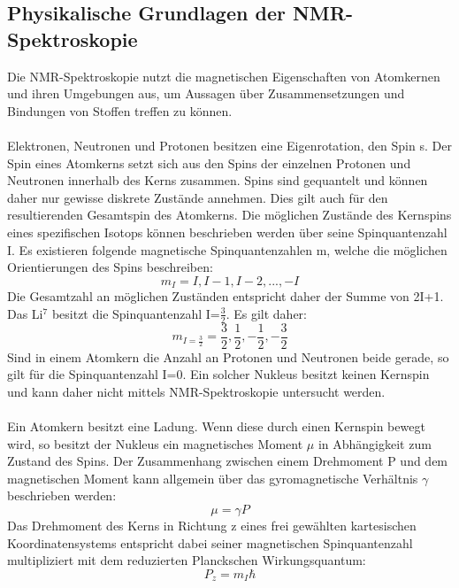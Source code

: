 \documentclass[a4paper, 11pt, headsepline,footsepline,twoside,abstract]{scrbook}
\begin{document}
\subsection{Physikalische Grundlagen der NMR-Spektroskopie}
Die NMR-Spektroskopie nutzt die magnetischen Eigenschaften von Atomkernen und ihren Umgebungen aus, um Aussagen über Zusammensetzungen und Bindungen von Stoffen treffen zu können.
\\\\
Elektronen, Neutronen und Protonen besitzen eine Eigenrotation, den Spin s. Der Spin eines Atomkerns setzt sich aus den Spins der einzelnen Protonen und Neutronen innerhalb des Kerns zusammen. Spins sind gequantelt und können daher nur gewisse diskrete Zustände annehmen. Dies gilt auch für den resultierenden Gesamtspin des Atomkerns. Die möglichen Zustände des Kernspins eines spezifischen Isotops können beschrieben werden über seine Spinquantenzahl I. Es existieren folgende magnetische Spinquantenzahlen m, welche die möglichen Orientierungen des Spins beschreiben:
\begin{equation}
m_I = I, I-1, I-2, ..., -I
\end{equation}
Die Gesamtzahl an möglichen Zuständen entspricht daher der Summe von 2I+1. Das Li$^7$ besitzt die Spinquantenzahl I=$\frac{3}{2}$. Es gilt daher:
\begin{equation}
m_{I=\frac{3}{2}} = \frac{3}{2}, \frac{1}{2}, -\frac{1}{2}, -\frac{3}{2}
\end{equation}
Sind in einem Atomkern die Anzahl an Protonen und Neutronen beide gerade, so gilt für die Spinquantenzahl I=0. Ein solcher Nukleus besitzt keinen Kernspin und kann daher nicht mittels NMR-Spektroskopie untersucht werden.
\\\\
Ein Atomkern besitzt eine Ladung. Wenn diese durch einen Kernspin bewegt wird, so besitzt der Nukleus ein magnetisches Moment $\mu$ in Abhängigkeit zum Zustand des Spins. Der Zusammenhang zwischen einem Drehmoment P und dem magnetischen Moment kann allgemein über das gyromagnetische Verhältnis $\gamma$ beschrieben werden: 
\begin{equation}
\mu = \gamma P
\end{equation}
Das Drehmoment des Kerns in Richtung z eines frei gewählten kartesischen Koordinatensystems entspricht dabei seiner magnetischen Spinquantenzahl multipliziert mit dem reduzierten Planckschen Wirkungsquantum:
\begin{equation}
P_z = m_I \hbar
\end{equation}
\end{document}
